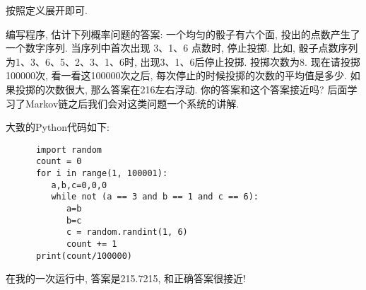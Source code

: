 \begin{solution*}
   按照定义展开即可. 
\end{solution*}

\begin{exercise}
   编写程序, 估计下列概率问题的答案: 一个均匀的骰子有六个面, 投出的点数产生了一个数字序列. 当序列中首次出现 3、1、6 点数时, 停止投掷. 比如, 骰子点数序列为1、3、6、5、2、3、1、6时, 出现3、1、6后停止投掷. 投掷次数为8. 现在请投掷100000次, 看一看这100000次之后, 每次停止的时候投掷的次数的平均值是多少. 如果投掷的次数很大, 那么答案在216左右浮动. 你的答案和这个答案接近吗? 后面学习了Markov链之后我们会对这类问题一个系统的讲解. 
\end{exercise}

\begin{solution*}
   大致的Python代码如下:
   \begin{verbatim}
      import random
      count = 0
      for i in range(1, 100001):
         a,b,c=0,0,0
         while not (a == 3 and b == 1 and c == 6):
            a=b
            b=c 
            c = random.randint(1, 6)
            count += 1
      print(count/100000)
   \end{verbatim}
   在我的一次运行中, 答案是215.7215, 和正确答案很接近! 
\end{solution*}